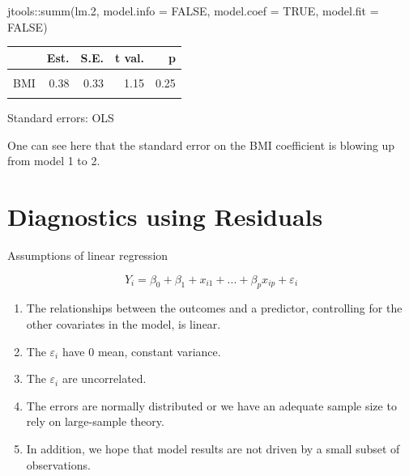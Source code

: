 \documentclass[
  letterpaper,
  DIV=11,
  numbers=noendperiod]{scrreport}
\newenvironment{Shaded}{\begin{snugshade}}{\end{snugshade}}
\newcommand{\AttributeTok}[1]{\textcolor[rgb]{0.40,0.45,0.13}{#1}}
\newcommand{\ConstantTok}[1]{\textcolor[rgb]{0.56,0.35,0.01}{#1}}
\newcommand{\FloatTok}[1]{\textcolor[rgb]{0.68,0.00,0.00}{#1}}
\newcommand{\FunctionTok}[1]{\textcolor[rgb]{0.28,0.35,0.67}{#1}}
\newcommand{\NormalTok}[1]{\textcolor[rgb]{0.00,0.23,0.31}{#1}}
\newcommand{\SpecialCharTok}[1]{\textcolor[rgb]{0.37,0.37,0.37}{#1}}
\providecommand{\tightlist}{%
  \setlength{\itemsep}{0pt}\setlength{\parskip}{0pt}}\usepackage{longtable,booktabs,array}
\begin{document}
\begin{Shaded}
\begin{Highlighting}[]
\NormalTok{jtools}\SpecialCharTok{::}\FunctionTok{summ}\NormalTok{(lm}\FloatTok{.2}\NormalTok{, }\AttributeTok{model.info =} \ConstantTok{FALSE}\NormalTok{, }\AttributeTok{model.coef =} \ConstantTok{TRUE}\NormalTok{, }\AttributeTok{model.fit =} \ConstantTok{FALSE}\NormalTok{)}
\end{Highlighting}
\end{Shaded}

\begin{table}[!h]
\centering
\begin{threeparttable}
\begin{tabular}{lrrrr}
\toprule
  & Est. & S.E. & t val. & p\\
\midrule
\cellcolor{gray!6}{(Intercept)} & \cellcolor{gray!6}{133.16} & \cellcolor{gray!6}{3.81} & \cellcolor{gray!6}{34.96} & \cellcolor{gray!6}{0.00}\\
BMI & 0.38 & 0.33 & 1.15 & 0.25\\
\cellcolor{gray!6}{weight} & \cellcolor{gray!6}{0.01} & \cellcolor{gray!6}{0.13} & \cellcolor{gray!6}{0.10} & \cellcolor{gray!6}{0.92}\\
\bottomrule
\end{tabular}
\begin{tablenotes}
\item Standard errors: OLS
\end{tablenotes}
\end{threeparttable}
\end{table}

One can see here that the standard error on the BMI coefficient is
blowing up from model 1 to 2.

\hypertarget{diagnostics-using-residuals}{%
\section{Diagnostics using
Residuals}\label{diagnostics-using-residuals}}

Assumptions of linear regression

\[Y_i = \beta_0 + \beta_1 + x_{i1} + ... + \beta_p x_{ip} + \varepsilon_i\]

\begin{enumerate}
\def\labelenumi{\arabic{enumi}.}
\tightlist
\item
  The relationships between the outcomes and a predictor, controlling
  for the other covariates in the model, is linear.
\item
  The \(\varepsilon_i\) have 0 mean, constant variance.
\item
  The \(\varepsilon_i\) are uncorrelated.
\item
  The errors are normally distributed or we have an adequate sample size
  to rely on large-sample theory.
\item
  In addition, we hope that model results are not driven by a small
  subset of observations.
\end{enumerate}
\end{document}
